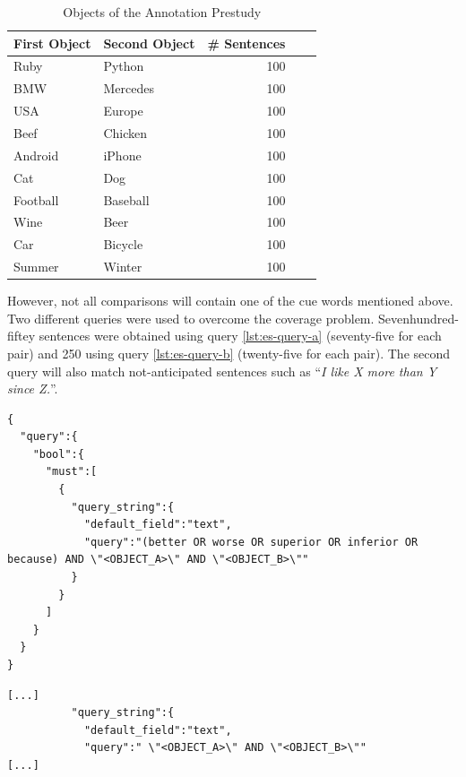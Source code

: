\begin{table}[h]
\centering
\caption{Objects of the Annotation Prestudy}
\label{tbl:prestudy-objects}
\begin{tabular}{@{}llrrr@{}}
\toprule
First Object & Second Object      & \# Sentences                             \\ \midrule
Ruby    & Python    & 100      \\
BMW    & Mercedes    & 100  \\
USA & Europe & 100 \\
Beef & Chicken & 100   \\
Android & iPhone    &   100  \\
Cat & Dog      &     100  \\ 
Football & Baseball   &  100 \\ 
Wine & Beer  & 100  \\
Car & Bicycle & 100 \\
Summer & Winter &  100\\
\bottomrule  
                               
\end{tabular}
\end{table}

However, not all comparisons will contain one of the cue words mentioned above. Two different queries were used to overcome the coverage problem. Sevenhundred-fiftey sentences were obtained using query \ref{lst:es-query-a} (seventy-five for each pair) and 250 using query \ref{lst:es-query-b} (twenty-five for each pair). The second query will also match not-anticipated sentences such as \enquote{\emph{I like X more than Y since Z.}}.



\begin{lstlisting}[label=lst:es-query-a,breaklines=true,postbreak=\mbox{\textcolor{red}{$\hookrightarrow$}\space},caption=Prestudy Sentence Selection Query A]
{
  "query":{
    "bool":{
      "must":[
        {
          "query_string":{
            "default_field":"text",
            "query":"(better OR worse OR superior OR inferior OR because) AND \"<OBJECT_A>\" AND \"<OBJECT_B>\""
          }
        }
      ]
    }
  }
}
\end{lstlisting}

\begin{lstlisting}[label=lst:es-query-b,breaklines=true,postbreak=\mbox{\textcolor{red}{$\hookrightarrow$}\space},caption=Prestudy Sentence Selection Query B (shortened)]
[...]
          "query_string":{
            "default_field":"text",
            "query":" \"<OBJECT_A>\" AND \"<OBJECT_B>\""
[...]
\end{lstlisting}

